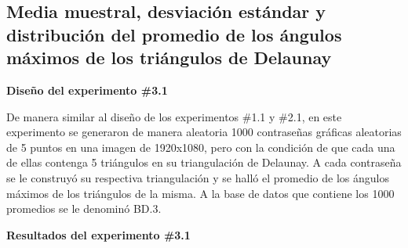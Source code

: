 \documentclass[12pt]{report}
\begin{document}
\subsection{Media muestral, desviación estándar y distribución del promedio de los ángulos máximos de los triángulos de Delaunay}
\label{sec:3.1}

\textbf{ Diseño del experimento \#3.1}

De manera similar al diseño de los experimentos \#1.1 y \#2.1, en este experimento se generaron de manera aleatoria 1000 contraseñas gráficas aleatorias de 5 puntos en una imagen de 1920x1080, pero con la condición de que cada una de ellas contenga 5 triángulos en su triangulación de Delaunay. A cada contraseña se le construyó su respectiva triangulación y se halló el promedio de los ángulos máximos de los triángulos de la misma. A la base de datos que contiene los 1000 promedios se le denominó BD.3.



\textbf{Resultados del experimento \#3.1}
\end{document}

